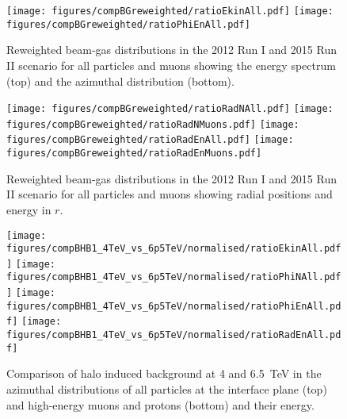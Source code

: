 \begin{figure}%
\centering
\texttt{[image: figures/compBGreweighted/ratioEkinAll.pdf]}
\texttt{[image: figures/compBGreweighted/ratioPhiEnAll.pdf]}
\caption{Reweighted beam-gas distributions in the 2012 Run I and 2015 Run II scenario for all particles and muons showing the energy spectrum (top) and the azimuthal distribution (bottom).
  \label{fig:compBGreweighted12}}
\end{figure}




\begin{figure}%
\centering
\texttt{[image: figures/compBGreweighted/ratioRadNAll.pdf]}
\texttt{[image: figures/compBGreweighted/ratioRadNMuons.pdf]}
\texttt{[image: figures/compBGreweighted/ratioRadEnAll.pdf]}
\texttt{[image: figures/compBGreweighted/ratioRadEnMuons.pdf]}
\caption{Reweighted beam-gas distributions in the 2012 Run I and 2015 Run II scenario for all particles and muons showing radial positions and energy in $r$.
  \label{fig:compBGreweighted2}}
\end{figure}


\begin{figure}
\begin{center}
  \texttt{[image: figures/compBHB1\_4TeV\_vs\_6p5TeV/normalised/ratioEkinAll.pdf]}
  \texttt{[image: figures/compBHB1\_4TeV\_vs\_6p5TeV/normalised/ratioPhiNAll.pdf]}
  \texttt{[image: figures/compBHB1\_4TeV\_vs\_6p5TeV/normalised/ratioPhiEnAll.pdf]}
  \texttt{[image: figures/compBHB1\_4TeV\_vs\_6p5TeV/normalised/ratioRadEnAll.pdf]}

\end{center}
\vspace{-0.6cm}
 \caption{Comparison of halo induced background at 4 and 6.5~TeV in the azimuthal distributions of all particles at the interface plane (top) and high-energy muons and protons (bottom) and their energy.
  \label{compBHB1run1run22}}
\end{figure}


